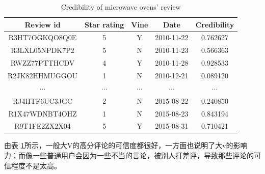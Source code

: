 \documentclass[12pt]{article}%
\begin{document}
\begin{table}[H]
	\centering
	\caption{Credibility of microwave ovens' review}	
	\begin{tabular}{ccccc}
		\toprule[1.5pt]
		\multicolumn{1}{m{3.5cm}}{\centering Review id} & \multicolumn{1}{m{2cm}}{\centering Star rating}&
		\multicolumn{1}{m{1cm}}{\centering Vine}&
		\multicolumn{1}{m{3cm}}{\centering Date}&
		\multicolumn{1}{m{2.5cm}}{\centering \textbf{Credibility}}\\
		\midrule[1pt]
		R3HT7OGKQO8Q0E &5&Y&2010-11-22&0.762627\\
		R3LXL05NPDK7P2 &5&N	&2010-11-23	&0.566363\\
		RWZZ77PTTHCDV &4&Y&2010-11-28&0.928533\\
		R2JK82HHMUGGOU &1&N&2010-12-21&0.089120\\
		$\cdots $&$\cdots $&$\cdots $&$\cdots $&$\cdots $\\
		RJ4HTF6UC3JGC &2&N&2015-08-22&0.240850\\
		R1X47WDNBT4OHZ &1&N&2015-08-23&0.843194\\
		R9T1FE2ZX2X04 &5&Y&2015-08-31&0.710421\\
		\bottomrule[1.6pt]
	\end{tabular}\label{biassssoss}
\end{table}

由表 \ref{biassssoss}所示，一般大V的高分评论的可信度都很好，一方面也说明了大v的影响力；而像一些普通用户会因为一些不当的言论，被别人打差评，导致那些评论的可信程度不是太高。

\end{document}

